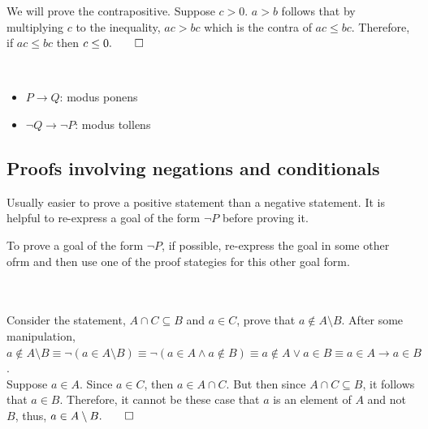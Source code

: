 \documentclass[../setup.tex]{subfiles}
\begin{document}
We will prove the contrapositive. Suppose $c > 0$. $a > b$ follows that by multiplying $c$ to the inequality, $ac > bc$ which is the contra of $ac \leq bc$. Therefore, if $ac \leq bc$ then $c \leq 0. \qed$ \\
\begin{remark}
	\phantom \\ 
	\begin{itemize}
		\item $P \rightarrow Q$: modus ponens
		\item $\lnot{Q} \rightarrow \lnot{P}$: modus tollens
	\end{itemize}
\end{remark}

\pagebreak
\subsection{Proofs involving negations and conditionals}
Usually easier to prove a positive statement than a negative statement. It is helpful to re-express a goal of the form $\lnot P$ before proving it.
\begin{theorem}
	To prove a goal of the form $\lnot{P}$, if possible, re-express the goal in some other ofrm and then use one of the proof stategies for this other goal form. 
\end{theorem}
\phantom \\ \\
Consider the statement, $A \cap C \subseteq B$ and $a \in C$, prove that $a \notin A \setminus B$. After some manipulation, $a \notin A \setminus B \equiv \lnot(a \in A \setminus B) \equiv \lnot (a \in A \land a \notin B) \equiv a \notin A \lor a \in B \equiv a \in A \rightarrow a \in B$. \\
Suppose $a \in A$. Since $a \in C$, then $a \in A \cap C$. But then since $A \cap C \subseteq B$, it follows that $a \in B$. Therefore, it cannot be these case that $a$ is an element of $A$ and not $B$, thus, $a \in A \setminus B. \qed$ 
\end{document}
